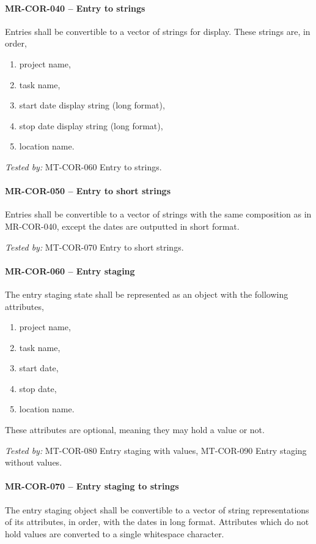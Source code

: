 \paragraph{MR-COR-040 -- Entry to strings}
Entries shall be convertible to a vector of strings for display.
These strings are, in order,
\begin{enumerate}
\item project name,
\item task name,
\item start date display string (long format),
\item stop date display string (long format),
\item location name.
\end{enumerate}

\textit{Tested by: } MT-COR-060 Entry to strings.

\paragraph{MR-COR-050 -- Entry to short strings}
Entries shall be convertible to a vector of strings with the same composition
as in MR-COR-040, except the dates are outputted in short format.

\textit{Tested by: } MT-COR-070 Entry to short strings.

\paragraph{MR-COR-060 -- Entry staging}
The entry staging state shall be represented as an object with the following
attributes,
\begin{enumerate}
\item project name,
\item task name,
\item start date,
\item stop date,
\item location name.
\end{enumerate}

These attributes are optional, meaning they may hold a value or not.

\textit{Tested by: } MT-COR-080 Entry staging with values,
MT-COR-090 Entry staging without values.

\paragraph{MR-COR-070 -- Entry staging to strings}
The entry staging object shall be convertible to a vector of string
representations of its attributes, in order, with the dates in
long format. Attributes which do not hold values are converted to a
single whitespace character.

